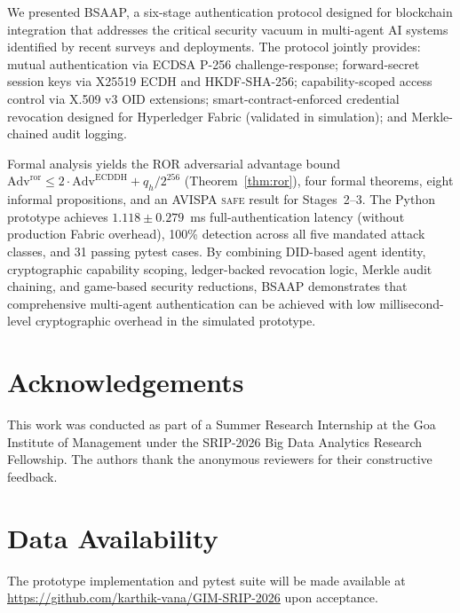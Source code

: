 \documentclass[review,5p,twocolumn,times]{elsarticle}
\begin{document}
We presented BSAAP, a six-stage authentication protocol designed for
blockchain integration that addresses the critical security vacuum in
multi-agent AI systems identified by recent surveys and deployments.
The protocol jointly provides:
mutual authentication via ECDSA P-256 challenge-response; forward-secret
session keys via X25519 ECDH and HKDF-SHA-256; capability-scoped access
control via X.509 v3 OID extensions; smart-contract-enforced credential
revocation designed for Hyperledger Fabric (validated in simulation); and
Merkle-chained audit logging.

Formal analysis yields the ROR adversarial advantage bound
$\mathrm{Adv}^{\mathrm{ror}} \leq 2\!\cdot\!\mathrm{Adv}^{\mathrm{ECDDH}}
+ q_h/2^{256}$ (Theorem~\ref{thm:ror}), four formal theorems, eight
informal propositions, and an AVISPA \textsc{safe} result for Stages~2--3.
The Python prototype achieves $1.118 \pm 0.279$~ms full-authentication
latency (without production Fabric overhead),
100\% detection across all five mandated attack classes, and 31 passing
pytest cases. By combining DID-based agent identity, cryptographic
capability scoping, ledger-backed revocation logic, Merkle audit chaining,
and game-based security reductions, BSAAP demonstrates that comprehensive
multi-agent authentication can be achieved with low millisecond-level
cryptographic overhead in the simulated prototype.

\section*{Acknowledgements}

This work was conducted as part of a Summer Research Internship at the
Goa Institute of Management under the SRIP-2026 Big Data Analytics
Research Fellowship. The authors thank the anonymous reviewers for their
constructive feedback.

\section*{Data Availability}

The prototype implementation and pytest suite will be made available
at \url{https://github.com/karthik-vana/GIM-SRIP-2026} upon acceptance.
\end{document}
